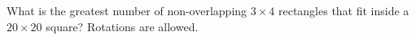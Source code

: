 What is the greatest number of non-overlapping $3\times4$ rectangles that fit inside a $20\times20$ square? Rotations are allowed.
